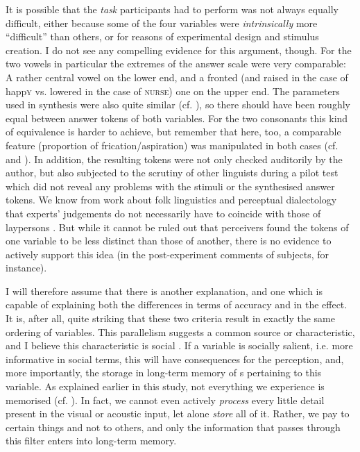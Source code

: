 It is possible that the \emph{task} participants had to perform was not always equally difficult, either because some of the four variables were \emph{intrinsically} more ``difficult'' than others, or for reasons of experimental design and stimulus creation.
I do not see any compelling evidence for this argument, though.
For the two vowels in particular the extremes of the answer scale were very comparable: A rather central vowel on the lower end, and a fronted (and raised in the case of happ\textsc{y} vs. lowered in the case of \textsc{nurse)} one on the upper end.
The parameters used in synthesis were also quite similar (cf. ), so there should have been roughly equal  between answer tokens of both variables.
For the two consonants this kind of equivalence is harder to achieve, but remember that here, too, a comparable feature (proportion of frication/aspiration) was manipulated in both cases (cf.  and ).
In addition, the resulting tokens were not only checked auditorily by the author, but also subjected to the scrutiny of other linguists during a pilot test which did not reveal any problems with the stimuli or the synthesised answer tokens.
We know from work about folk linguistics and perceptual dialectology that experts' judgements do not necessarily have to coincide with those of laypersons \parencite{preston1999,niedzielskipreston2000}.
But while it cannot be ruled out that perceivers found the tokens of one variable to be less distinct than those of another, there is no evidence to actively support this idea (in the post-experiment comments of subjects, for instance). 

I will therefore assume that there is another explanation, and one which is capable of explaining both the differences in terms of accuracy and in the  effect.
It is, after all, quite striking that these two criteria result in exactly the same ordering of variables.
This parallelism suggests a common source or characteristic, and I believe this characteristic is social .
If a variable is socially salient, i.e. more informative in social terms, this will have consequences for the perception, and, more importantly, the storage in long-term memory of s pertaining to this variable.
As explained earlier in this study, not everything we experience is memorised (cf. ).
In fact, we cannot even actively \emph{process} every little detail present in the visual or acoustic input, let alone \emph{store} all of it.
Rather, we pay  to certain things and not to others, and only the information that passes through this filter enters into long-term memory.

